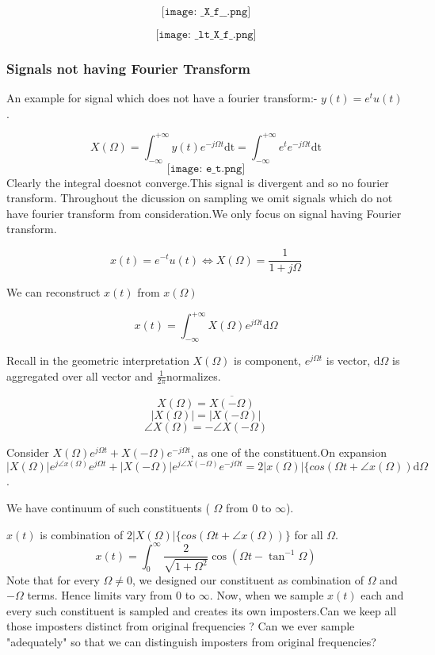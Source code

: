 $$\texttt{[image: \_X\_f\_\_.png]}$$

$$\texttt{[image: \_lt\_X\_f\_.png]}$$


\subsubsection{Signals not having Fourier Transform}

An example for signal which does not have a fourier transform:- 
$y(t)=e^t u(t)$.



$$X(\Omega)= \int_{-\infty}^{+\infty} y(t)e^{-j\Omega t}\mbox{dt}=\int_{-\infty}^{+\infty} e^{t}e^{-j\Omega t}\mbox{dt}$$
$$\texttt{[image: e\_t.png]}$$
Clearly the integral doesnot converge.This signal is divergent and so no fourier transform.
Throughout the dicussion on sampling we omit signals which do not have fourier transform from consideration.We only focus on signal having Fourier transform.


$$x(t)=e^{-t}u(t) \iff X(\Omega)=\frac{1}{1+j\Omega}$$

We can reconstruct $x(t)$ from $x(\Omega)$

$$x(t)= \int_{-\infty}^{+\infty} X(\Omega)e^{j\Omega t}\mbox{d}\Omega$$

Recall in the geometric interpretation $X(\Omega)$ is component, $e^{j\Omega t}$ is vector, $\mbox{d}\Omega$ is aggregated over all vector and $\frac{1}{2\pi}$normalizes.

$$X(\Omega)= \overline{X(-\Omega)}$$ $$|X(\Omega)|=|X(-\Omega)|$$
$$ \angle X(\Omega)= - \angle X(-\Omega)$$

Consider  $X(\Omega)e^{j\Omega t} + X(-\Omega)e^{-j\Omega t}$, as one of the constituent.On expansion
$$|X(\Omega)| e ^{j\angle x(\Omega)} e^{j\Omega t} + |X(-\Omega)| e ^{j\angle X(-\Omega)} e^{-j\Omega t}  = 2|x(\Omega)|\{cos(\Omega t + \angle x(\Omega))\mbox{d}\Omega$$ .


We have continuum of such constituents ( $\Omega$ from 0 to $\infty$).



$x(t)$ is combination of $2|X(\Omega)|\{cos(\Omega t + \angle x(\Omega))\}$ for all  $\Omega$.
$$x(t)=\int_0^{\infty}\frac{2}{\sqrt{1+\Omega ^2}}\cos(\Omega t - \tan^{-1}\Omega)$$Note that for every $\Omega \neq 0$, we designed our constituent as combination of $\Omega$ and $-\Omega$ terms. Hence limits vary from $0$ to $\infty$.
Now, when we sample $x(t)$ each and every such constituent is sampled and creates its own imposters.Can we keep all those imposters distinct from original frequencies ? Can we ever sample "adequately" so that we can distinguish imposters from original frequencies?
